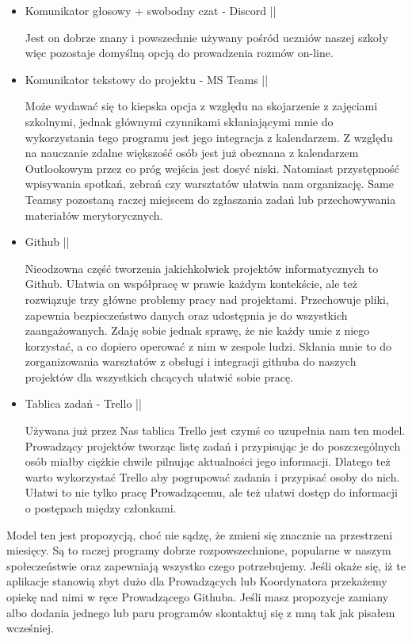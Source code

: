 \documentclass[9pt,a4paper]{report}
\begin{document}
\begin{itemize} 

\item Komunikator głosowy + swobodny czat - Discord || 

Jest on dobrze znany i powszechnie używany pośród uczniów naszej szkoły więc pozostaje domyślną opcją do prowadzenia rozmów on-line. 

\item Komunikator tekstowy do projektu - MS Teams || 

Może wydawać się to kiepska opcja z względu na skojarzenie z zajęciami szkolnymi, jednak głównymi czynnikami skłaniającymi mnie do wykorzystania tego programu jest jego integracja z kalendarzem. Z względu na nauczanie zdalne większość osób jest już obeznana z kalendarzem Outlookowym przez co próg wejścia jest dosyć niski. Natomiast przystępność wpisywania spotkań, zebrań czy warsztatów ułatwia nam organizację. Same Teamsy pozostaną raczej miejscem do zgłaszania zadań lub przechowywania materiałów merytorycznych. 

\item Github || 

Nieodzowna część tworzenia jakichkolwiek projektów informatycznych to Github. Ułatwia on współpracę w prawie każdym kontekście, ale też rozwiązuje trzy główne problemy pracy nad projektami. Przechowuje pliki, zapewnia bezpieczeństwo danych oraz udostępnia je do wszystkich zaangażowanych. Zdaję sobie jednak sprawę, że nie każdy umie z niego korzystać, a co dopiero operować z nim w zespole ludzi. Skłania mnie to do zorganizowania warsztatów z obsługi i integracji githuba do naszych projektów dla wszystkich chcących ułatwić sobie pracę. 

\item Tablica zadań - Trello || 

Używana już przez Nas tablica Trello jest czymś co uzupełnia nam ten model. Prowadzący projektów tworząc listę zadań i przypisując je do poszczególnych osób miałby ciężkie chwile pilnując aktualności jego informacji. Dlatego też warto wykorzystać Trello aby pogrupować zadania i przypisać osoby do nich. Ułatwi to nie tylko pracę Prowadzącemu, ale też ułatwi dostęp do informacji o postępach między członkami. 

\end{itemize}

Model ten jest propozycją, choć nie sądzę, że zmieni się znacznie na przestrzeni miesięcy. Są to raczej programy dobrze rozpowszechnione, popularne w naszym społeczeństwie oraz zapewniają wszystko czego potrzebujemy. Jeśli okaże się, iż te aplikacje stanowią zbyt dużo dla Prowadzących lub Koordynatora przekażemy opiekę nad nimi w ręce Prowadzącego Githuba. Jeśli masz propozycje zamiany albo dodania jednego lub paru programów skontaktuj się z mną tak jak pisałem wcześniej. 
\end{document}
